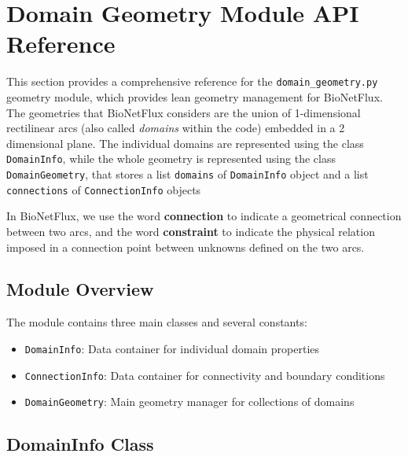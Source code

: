 %




\section{Domain Geometry Module API Reference}
\label{sec:domain_geometry_api}


This section provides a comprehensive reference for the \texttt{domain\_geometry.py} 
geometry module, which provides 
lean geometry management for BioNetFlux. 
The geometries that BioNetFlux considers are the union of 1-dimensional rectilinear arcs (also called {\em domains} within the code) embedded in a 2 dimensional plane.  The individual domains are represented using the class {\tt DomainInfo}, while the whole geometry is represented using the class {\tt DomainGeometry}, that stores a list {\tt domains} of {\tt DomainInfo} object and a list {\tt connections} of {\tt ConnectionInfo} objects

\begin{notebox}
	In BioNetFlux, we use the word {\bf connection} to indicate a geometrical connection between two arcs, and the word {\bf constraint} to indicate the physical relation imposed in a connection point between unknowns defined on the two arcs.
\end{notebox}


\subsection{Module Overview}

The module contains three main classes and several constants:
\begin{itemize}
    \item \texttt{DomainInfo}: Data container for individual domain properties
    \item \texttt{ConnectionInfo}: Data container for connectivity and boundary conditions
    \item \texttt{DomainGeometry}: Main geometry manager for collections of domains
\end{itemize}




\subsection{DomainInfo Class}
\label{subsec:domaininfo_class}


